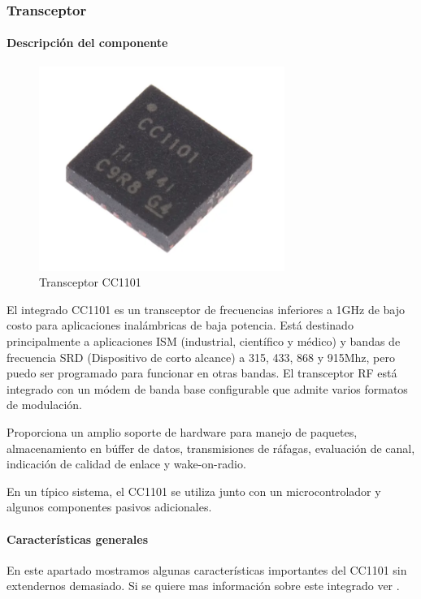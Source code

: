 \subsubsection{Transceptor}
\paragraph{Descripción del componente} \par


\begin{figure}[htb]
	\centering
	\includegraphics[scale=0.6]{images/CC1101.png}
    \caption{Transceptor CC1101}
	\label{fig:cc1101}
\end{figure}

El integrado CC1101 es un transceptor de frecuencias inferiores a 1GHz de bajo costo para aplicaciones inalámbricas de baja potencia. Está destinado principalmente
a aplicaciones ISM (industrial, científico y médico) y bandas de frecuencia SRD (Dispositivo de corto alcance) a 315, 433, 868 y 915Mhz, pero puedo ser programado 
para funcionar en otras bandas. El transceptor RF está integrado con un módem de banda base configurable que admite varios formatos de modulación.\par 
Proporciona un amplio soporte de hardware para manejo de paquetes, almacenamiento en búffer de datos, transmisiones de ráfagas, evaluación de canal,
indicación de calidad de enlace y wake-on-radio. \par 
En un típico sistema, el CC1101 se utiliza junto con un microcontrolador y algunos componentes pasivos adicionales.

\paragraph{Características generales} \par

En este apartado mostramos algunas características importantes del CC1101 sin extendernos demasiado. Si se quiere mas información sobre este integrado ver \cite{cc1101}.

